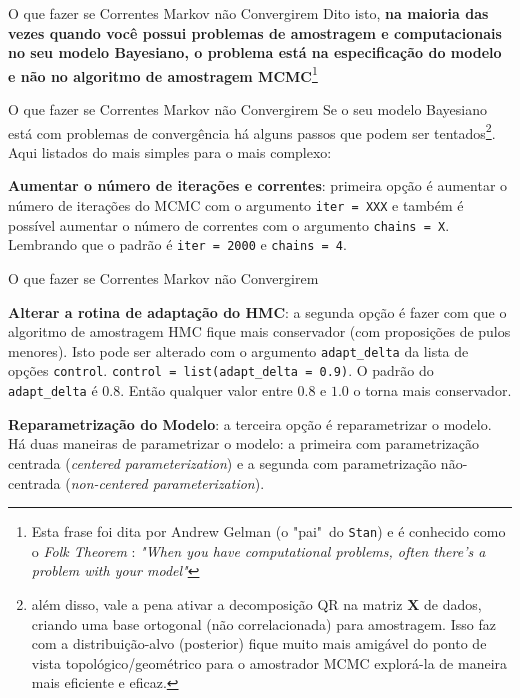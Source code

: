 \begin{frame}{O que fazer se Correntes Markov não Convergirem}
  \vfill
  Dito isto, \textbf{na maioria das vezes quando você
  possui problemas de amostragem e computacionais no seu modelo Bayesiano, o problema
  está na especificação do modelo e não no algoritmo de amostragem MCMC}\footnote{Esta
  frase foi dita por Andrew Gelman (o "pai"~do \texttt{Stan}) e é conhecido como o
  \textit{Folk Theorem} \parencite{gelmanFolkTheoremStatistical2008}:
  \textit{"When you have computational problems, often there’s a problem with
  your model"}}
\end{frame}

\begin{frame}{O que fazer se Correntes Markov não Convergirem}
  Se o seu modelo Bayesiano está com problemas de convergência há alguns
  passos que podem ser tentados\footnote{além disso,
  vale a pena ativar a decomposição QR na matriz $\mathbf{X}$ de dados, criando uma
  base ortogonal (não correlacionada) para amostragem. Isso faz com a distribuição-alvo
  (posterior) fique muito mais amigável do ponto de vista topológico/geométrico
  para o amostrador MCMC explorá-la de maneira mais eficiente e eficaz.}.
  Aqui listados do mais simples para o mais complexo:
  \begin{vfilleditems}
    \item \textbf{Aumentar o número de iterações e correntes}: primeira opção
    é aumentar o número de iterações do MCMC com o argumento \texttt{iter = XXX}
    e também é possível aumentar o número de correntes com o argumento
    \texttt{chains = X}. Lembrando que o padrão é \texttt{iter = 2000} e
    \texttt{chains = 4}.
  \end{vfilleditems}
\end{frame}

\begin{frame}{O que fazer se Correntes Markov não Convergirem}
  \begin{vfilleditems}
    \item \textbf{Alterar a rotina de adaptação do HMC}: a segunda opção é fazer com
    que o algoritmo de amostragem HMC fique mais conservador
    (com proposições de pulos menores). Isto pode ser alterado com o argumento
    \texttt{adapt\_delta} da lista de opções \texttt{control}.
    \texttt{control = list(adapt\_delta = 0.9)}. O padrão do \texttt{adapt\_delta} é $0.8$.
    Então qualquer valor entre $0.8$ e $1.0$ o torna mais conservador.
    \item \textbf{Reparametrização do Modelo}: a terceira opção é reparametrizar o
    modelo. Há duas maneiras de parametrizar o modelo: a primeira com parametrização
    centrada (\textit{centered parameterization}) e a segunda com parametrização
    não-centrada (\textit{non-centered parameterization}).
  \end{vfilleditems}
\end{frame}

